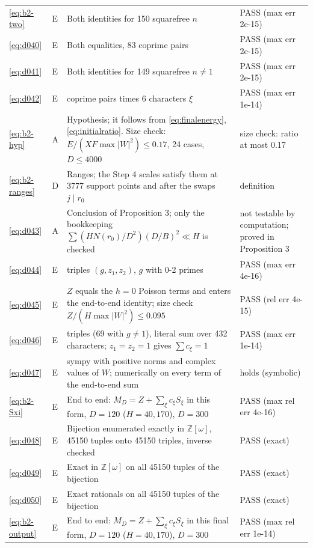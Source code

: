 \documentclass[11pt]{article}
\numberwithin{equation}{section}
\begin{document}
\begin{longtable}{@{}>{\raggedright\arraybackslash}p{1.2cm}>{\centering\arraybackslash}p{0.7cm}>{\raggedright\arraybackslash}p{9.05cm}>{\raggedright\arraybackslash}p{4.3cm}@{}}
\eqref{eq:b2-two} & E & Both identities for 150 squarefree $n$ & PASS (max err 2e-15)\\
\eqref{eq:d040} & E & Both equalities, 83 coprime pairs & PASS (max err 2e-15)\\
\eqref{eq:d041} & E & Both identities for 149 squarefree $n\ne1$ & PASS (max err 2e-15)\\
\eqref{eq:d042} & E & 83 coprime pairs times 6 characters $\xi$ & PASS (max err 1e-14)\\
\eqref{eq:b2-hyp} & A & Hypothesis; it follows from \eqref{eq:finalenergy}, \eqref{eq:initialratio}. Size check: $E/(XF\max|W|^2)\le0.17$, 24 cases, $D\le4000$ & size check: ratio at most 0.17\\
\eqref{eq:b2-ranges} & D & Ranges; the Step 4 scales satisfy them at 3777 support points and after the swaps $j\mid r_0$ & definition\\
\eqref{eq:d043} & A & Conclusion of Proposition 3; only the bookkeeping $\sum(HN(r_0)/D^2)(D/B)^2\ll H$ is checked & not testable by computation; proved in Proposition 3\\
\eqref{eq:d044} & E & 72 triples $(g,z_1,z_2)$, $g$ with 0-2 primes & PASS (max err 4e-16)\\
\eqref{eq:d045} & E & $Z$ equals the $h=0$ Poisson terms and enters the end-to-end identity; size check $Z/(H\max|W|^2)\le0.095$ & PASS (rel err 4e-15)\\
\eqref{eq:d046} & E & 72 triples (69 with $g\ne1$), literal sum over 432 characters; $z_1=z_2=1$ gives $\sum c_\xi=1$ & PASS (max err 1e-14)\\
\eqref{eq:d047} & E & sympy with positive norms and complex values of $W$; numerically on every term of the end-to-end sum & holds (symbolic)\\
\eqref{eq:b2-Sxi} & E & End to end: $M_D=Z+\sum_\xi c_\xi S_\xi$ in this form, $D=120$ ($H=40,170$), $D=300$ & PASS (max rel err 4e-16)\\
\eqref{eq:d048} & E & Bijection enumerated exactly in $\mathbb Z[\omega]$, 45150 tuples onto 45150 triples, inverse checked & PASS (exact)\\
\eqref{eq:d049} & E & Exact in $\mathbb Z[\omega]$ on all 45150 tuples of the bijection & PASS (exact)\\
\eqref{eq:d050} & E & Exact rationals on all 45150 tuples of the bijection & PASS (exact)\\
\eqref{eq:b2-output} & E & End to end: $M_D=Z+\sum_\xi c_\xi S_\xi$ in this final form, $D=120$ ($H=40,170$), $D=300$ & PASS (max rel err 1e-14)\\

\end{longtable}
\end{document}
